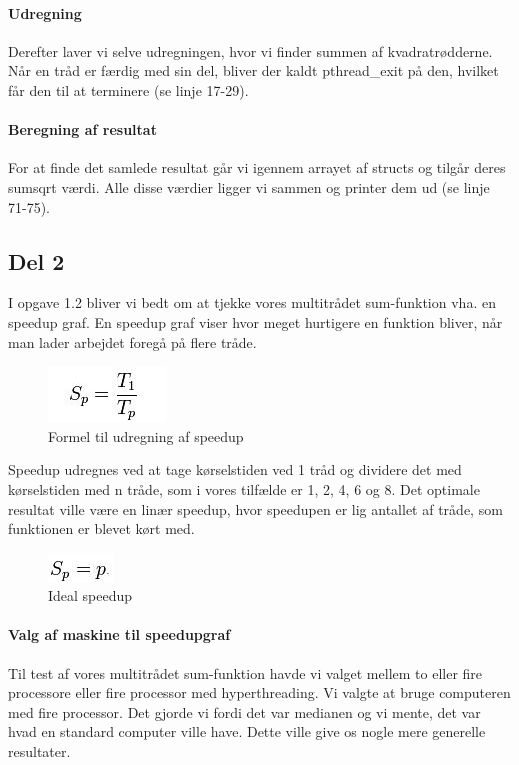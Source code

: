 \paragraph{Udregning} Derefter laver vi selve udregningen, hvor vi finder summen af kvadratrødderne. Når en tråd er færdig med sin del, bliver der kaldt pthread\_exit på den, hvilket får den til at terminere (se linje 17-29).
\paragraph{Beregning af resultat} For at finde det samlede resultat går vi igennem arrayet af structs og tilgår deres sumsqrt værdi. Alle disse værdier ligger vi sammen og printer dem ud (se linje 71-75).

\subsection{Del 2}
\label{O1_2}
I opgave 1.2 bliver vi bedt om at tjekke vores multitrådet sum-funktion vha. en speedup graf.
En speedup graf viser hvor meget hurtigere en funktion bliver, når man lader arbejdet foregå på flere tråde.

\begin{figure}[h!]
\centering
\includegraphics{Images/oo2-1-2-SpeedUpFormel}
\caption{Formel til udregning af speedup}
\label{SpeedFormel}
\end{figure}

Speedup udregnes ved at tage kørselstiden ved 1 tråd og dividere det med kørselstiden med n tråde, som i vores tilfælde er 1, 2, 4, 6 og 8. Det optimale resultat ville være en linær speedup, hvor speedupen er lig antallet af tråde, som funktionen er blevet kørt med.

\begin{figure}[h!]
\centering
\includegraphics{Images/oo2-1-2-IdealSpeedUp}
\caption{Ideal speedup}
\label{IdealSpeed}
\end{figure}

\paragraph{Valg af maskine til speedupgraf}
Til test af vores multitrådet sum-funktion havde vi valget mellem to eller fire processore eller fire processor med hyperthreading. Vi valgte at bruge computeren med fire processor. Det gjorde vi fordi det var medianen og vi mente,  det var hvad en standard computer ville have. Dette ville give os nogle mere generelle resultater. 

